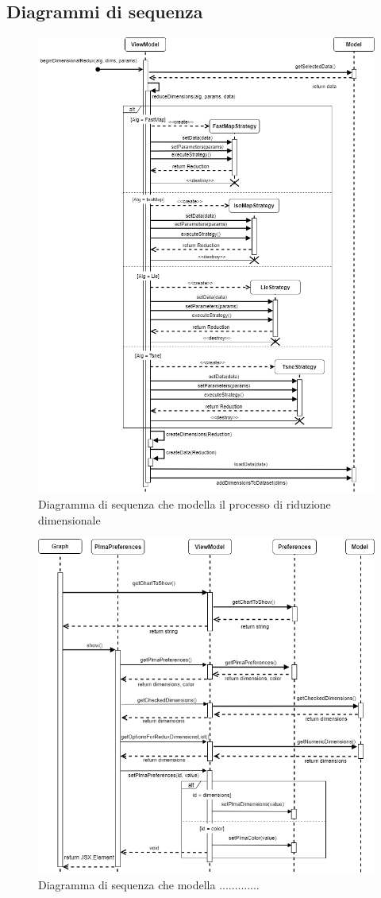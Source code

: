 \subsection{Diagrammi di sequenza}
\begin{figure}[hb]
\includegraphics[width=12cm]{Images/Allegato Tecnico-Sequenza-DR}
\centering
\caption{Diagramma di sequenza che modella il processo di riduzione dimensionale}
\end{figure}
\newpage
\begin{figure}[hb]
\includegraphics[width=16cm]{Images/Allegato Tecnico-Sequenza-PLMApref}
\centering
\caption{Diagramma di sequenza che modella .............}
\end{figure}
